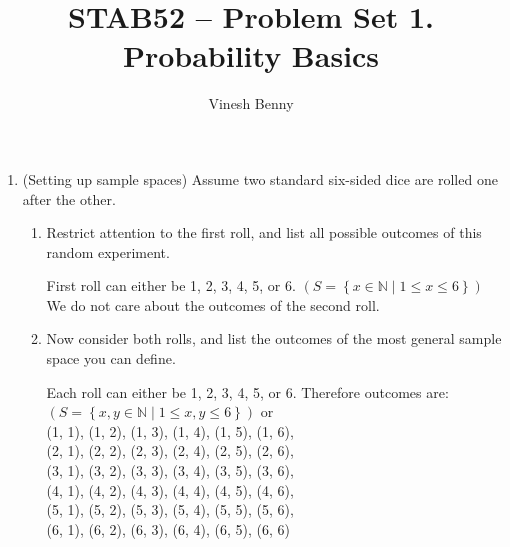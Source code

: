 \documentclass[11pt]{article}
\title{STAB52 -- Problem Set 1. Probability Basics}
\author{Vinesh Benny}
\begin{document}
	\begin{enumerate}
		\item (Setting up sample spaces) Assume two standard six-sided dice are rolled one after the other.
			\begin{enumerate} %
				\item Restrict attention to the first roll, and list all possible outcomes of this random experiment.
					\begin{mdframed}
						First roll can either be 1, 2, 3, 4, 5, or 6.  $\left( S =  \left\lbrace x \in \mathbb{N} \mid 1 \leq x \leq 6  \right\rbrace \right) $\\
						We do not care about the outcomes of the second roll.
					\end{mdframed}
				\item Now consider both rolls, and list the outcomes of the most general sample space you can define.
					\begin{mdframed}
						Each roll can either be 1, 2, 3, 4, 5, or 6. Therefore outcomes are: $ \left( S =  \left\lbrace x, y \in \mathbb{N} \mid 1 \leq x, y \leq 6  \right\rbrace \right) $ or\\
						\textbraceleft (1, 1), (1, 2), (1, 3), (1, 4), (1, 5), (1, 6),\\
						(2, 1), (2, 2), (2, 3), (2, 4), (2, 5), (2, 6),\\
						(3, 1), (3, 2), (3, 3), (3, 4), (3, 5), (3, 6),  \\
						(4, 1), (4, 2), (4, 3), (4, 4), (4, 5), (4, 6),  \\
						(5, 1), (5, 2), (5, 3), (5, 4), (5, 5), (5, 6),  \\
						(6, 1), (6, 2), (6, 3), (6, 4), (6, 5), (6, 6) \textbraceright
					\end{mdframed}
			\end{enumerate}


\end{enumerate}
\end{document}
